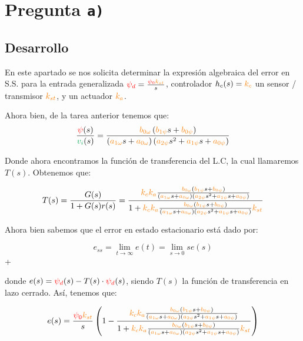 \section{Pregunta \texttt{a)}}\label{pregunta-a}

\subsection{Desarrollo}

En este apartado se nos solicita determinar la expresión algebraica del error en
S.S. para la entrada generalizada \( \rojo{\psi_d} = \frac{\rojo{\psi_0}\nara{k_{st}}}{s} \),
controlador \(h_{c}(s)=\nara{k_c}\) un sensor / transmisor \(\nara{k_{st}}\),
y un actuador \(\nara{k_{a}}\). 

Ahora bien, de la tarea anterior tenemos que:
\begin{equation}
  \frac{\rojo{\psi}(s)}{\verd{v_i}(s)} =
  \frac{\nara{\nara{b_{0\omega}}}\left(\nara{b_{1\psi}}s + \nara{b_{0\psi}}\right)}
  {\left(\nara{a_{1\omega}}s + \nara{a_{0\omega}}\right)\left(\nara{a_{2\psi}}s^{2} + \nara{a_{1\psi}}s + \nara{a_{0\psi}}\right)}
\end{equation}

Donde ahora encontramos la función de transferencia del L.C, la cual llamaremos
\(T(s)\). Obtenemos que:

\begin{equation}
  T(s) = \frac{G(s)}{1 + G(s)r(s)} = \dfrac{\nara{k_ck_a} \frac{\nara{\nara{b_{0\omega}}}\left(\nara{b_{1\psi}}s + \nara{b_{0\psi}}\right)}
  {\left(\nara{a_{1\omega}}s + \nara{a_{0\omega}}\right)\left(\nara{a_{2\psi}}s^{2} + \nara{a_{1\psi}}s + \nara{a_{0\psi}}\right)}}{1+\nara{k_ck_a} \frac{\nara{\nara{b_{0\omega}}}\left(\nara{b_{1\psi}}s + \nara{b_{0\psi}}\right)}
  {\left(\nara{a_{1\omega}}s + \nara{a_{0\omega}}\right)\left(\nara{a_{2\psi}}s^{2} + \nara{a_{1\psi}}s + \nara{a_{0\psi}}\right)}\nara{k_{st}}}
\end{equation}


Ahora bien sabemos que el error en estado estacionario está dado por:

\begin{equation}
  e_{ss} = \lim_{t \to \infty} e(t) = \lim_{s \to 0} s e(s)
\end{equation}+


donde \( e(s) = \mathbin{\color{red}\psi_d}(s) - T(s) \cdot \mathbin{\color{red}\psi_d}(s) \), siendo \( T(s) \) la función de transferencia en lazo cerrado. Así, tenemos que:

\begin{equation}
  e(s) = \frac{\rojo{\psi_0}\nara{k_{st}}}{s} \left( 1 - \dfrac{\nara{k_ck_a} \frac{\nara{\nara{b_{0\omega}}}\left(\nara{b_{1\psi}}s + \nara{b_{0\psi}}\right)}
{\left(\nara{a_{1\omega}}s + \nara{a_{0\omega}}\right)\left(\nara{a_{2\psi}}s^{2} + \nara{a_{1\psi}}s + \nara{a_{0\psi}}\right)}}{1+\nara{k_ck_a} \frac{\nara{\nara{b_{0\omega}}}\left(\nara{b_{1\psi}}s + \nara{b_{0\psi}}\right)}
{\left(\nara{a_{1\omega}}s + \nara{a_{0\omega}}\right)\left(\nara{a_{2\psi}}s^{2} + \nara{a_{1\psi}}s + \nara{a_{0\psi}}\right)}\nara{k_{st}}} \right)
\end{equation}


